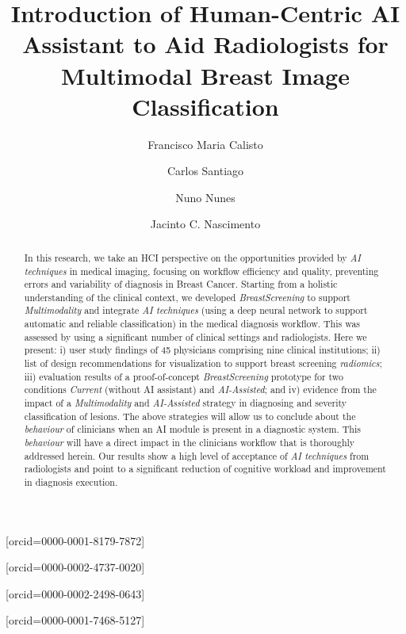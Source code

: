 \documentclass[a4paper,fleqn]{cas-sc}
\begin{document}
\let\WriteBookmarks\relax
\def\floatpagepagefraction{1}
\def\textpagefraction{.001}
\setlength{\marginparwidth }{2cm}

\title{Introduction of Human-Centric AI Assistant to Aid Radiologists for Multimodal Breast Image Classification}

\author[1]{Francisco Maria Calisto}[orcid=0000-0001-8179-7872]

\author[1]{Carlos Santiago}[orcid=0000-0002-4737-0020]

\author[2]{Nuno Nunes}[orcid=0000-0002-2498-0643]

\author[1]{Jacinto C. Nascimento}[orcid=0000-0001-7468-5127]

\address[1]{Institute for Systems and Robotics, Avenida Rovisco Pais 1, 1049-001, Lisbon, Portugal}
\address[2]{Interactive Technologies Institute, Caminho da Penteada, 9020-105, Funchal, Madeira, Portugal}

\begin{abstract}
In this research, we take an HCI perspective on the opportunities provided by {\it AI techniques} in medical imaging, focusing on workflow efficiency and quality, preventing errors and variability of diagnosis in Breast Cancer. Starting from a holistic understanding of the clinical context, we developed {\it BreastScreening} to support {\it Multimodality} and integrate {\it AI techniques} (using a deep neural network to support automatic and reliable classification) in the medical diagnosis workflow.
This was assessed by using a significant number of clinical settings and radiologists.
Here we present:
i) user study findings of 45 physicians comprising nine clinical institutions;
ii) list of design recommendations for visualization to support breast screening {\it radiomics};
iii) evaluation results of a proof-of-concept {\it BreastScreening} prototype for two conditions {\it Current} (without AI assistant) and {\it AI-Assisted}; and
iv) evidence from the impact of a {\it Multimodality} and {\it AI-Assisted} strategy in diagnosing and severity classification of lesions.
The above strategies will allow us to conclude about the {\it behaviour} of clinicians when an AI module is present in a diagnostic system.
This {\it behaviour} will have a direct impact in the clinicians workflow that is thoroughly addressed herein.
Our results show a high level of acceptance of {\it AI techniques} from radiologists and point to a significant reduction of cognitive workload and improvement in diagnosis execution.
\end{abstract}
\end{document}

